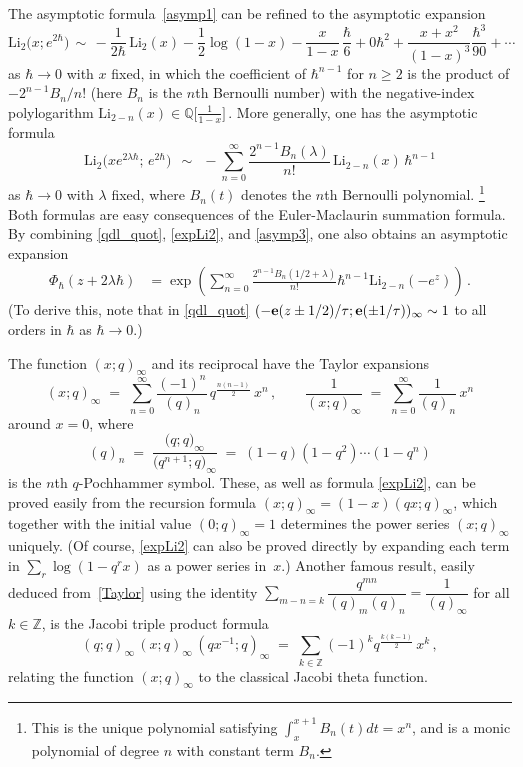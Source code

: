 \documentclass[hyper]{JHEP3}
\newcommand{\Z}{{\mathbb{Z}}}
\newcommand\be{\begin{equation}}
\newcommand\ee{\end{equation}}
\def\={\;=\;}
\def\Li{\text{Li}_2}
\def\e{\bold e}
\begin{document}
\smallskip{}
The asymptotic formula~\eqref{asymp1}  can be refined to the asymptotic expansion
  \be\label{asymp2} \Li\bigl(x;e^{2\hbar}\bigr)\,\sim\,-\frac1{2\hbar}\,\Li(x)-\frac12\log(1-x)
    -\frac x{1-x}\,\frac\hbar{6}+0\hbar^2+\frac{x+x^2}{(1-x)^3}\frac{\hbar^3}{90}+\cdots\ee
as $\hbar\to0$ with $x$ fixed, in which the coefficient of $\hbar^{n-1}$ for $n\ge2$ is the product
of $-2^{n-1}B_n/n!$ (here $B_n$ is the $n$th Bernoulli number) with the negative-index polylogarithm
$\text{Li}_{2-n}(x)\in\mathbb Q\bigl[\frac1{1-x}\bigr]\,$.  More generally, one has the asymptotic formula
  \be\label{asymp3} \Li\bigl(xe^{2\lambda\hbar};\,e^{2\hbar}\bigr)\;\,\sim\;\,
  -\sum_{n=0}^\infty\frac{2^{n-1}B_n(\lambda)}{n!}\,\text{Li}_{2-n}(x)\,\hbar^{n-1}\ee
as $\hbar\to0$ with $\lambda$ fixed, where $B_n(t)$ denotes the $n$th Bernoulli
polynomial.%
\footnote{This is the unique polynomial satisfying $\int_x^{x+1} B_n(t)dt = x^n$, and is a monic polynomial of degree $n$ with constant term $B_n$.} %
Both formulas are easy consequences of the Euler-Maclaurin summation formula. By combining \eqref{qdl_quot}, \eqref{expLi2}, and \eqref{asymp3}, one also obtains an asymptotic expansion
%
\begin{align} \Phi_\hbar(z+2\lambda\hbar) &= \exp\left(\sum_{n=0}^\infty \frac{2^{n-1}B_{n}(1/2+\lambda)}{n!}\hbar^{n-1}
\text{Li}_{2-n}(-e^z)\right)\,. \label{qdl-hbarexpansion} 
\end{align}
%
(To derive this, note that in \eqref{qdl_quot} $(-\e(z\pm1/2)/\tau;\e(\pm1/\tau))_\infty \sim 1$
to all orders in $\hbar$ as $\hbar\rightarrow 0$.)


\smallskip{} The function $(x;q)_\infty$ and its reciprocal have the Taylor
expansions
  \be\label{Taylor} (x;q)_\infty\=\sum_{n=0}^\infty\frac{(-1)^n}{(q)_n}\,q^{\frac{n(n-1)}2}\,x^n\,,
  \qquad\frac1{(x;q)_\infty}\=\sum_{n=0}^\infty\frac1{(q)_n}\,x^n \ee
around $x=0$, where
  \be\label{qPochn} (q)_n\=\frac{\bigl(q;q\bigr)_\infty}{\bigl(q^{n+1};q\bigr)_\infty}
  \=(1-q)(1-q^2)\cdots(1-q^n) \ee
is the $n$th $q$-Pochhammer symbol.  These, as well as formula \eqref{expLi2}, can be proved easily from
the recursion formula $(x;q)_\infty=(1-x)(qx;q)_\infty$, which together with the initial value
$(0;q)_\infty=1$ determines the power series $(x;q)_\infty$ uniquely.  (Of course, \eqref{expLi2} can
also be proved directly by expanding each term in $\sum_r\log(1-q^rx)$ as a power series in~$x$.)
Another famous result, easily deduced from~\eqref{Taylor} using the identity
$\sum\limits_{m-n=k}\dfrac{q^{mn}}{(q)_m(q)_n}=\dfrac1{(q)_\infty}$ for all $k\in\Z$, is the Jacobi triple product formula
  \be\label{triple} (q;q)_\infty\,(x;q)_\infty\,(qx^{-1};q)_\infty
  \=\sum_{k\in\mathbb Z}(-1)^kq^{\frac{k(k-1)}2}\,x^k\,,  \ee
relating the function $(x;q)_\infty$ to the classical Jacobi theta function.
\end{document}
